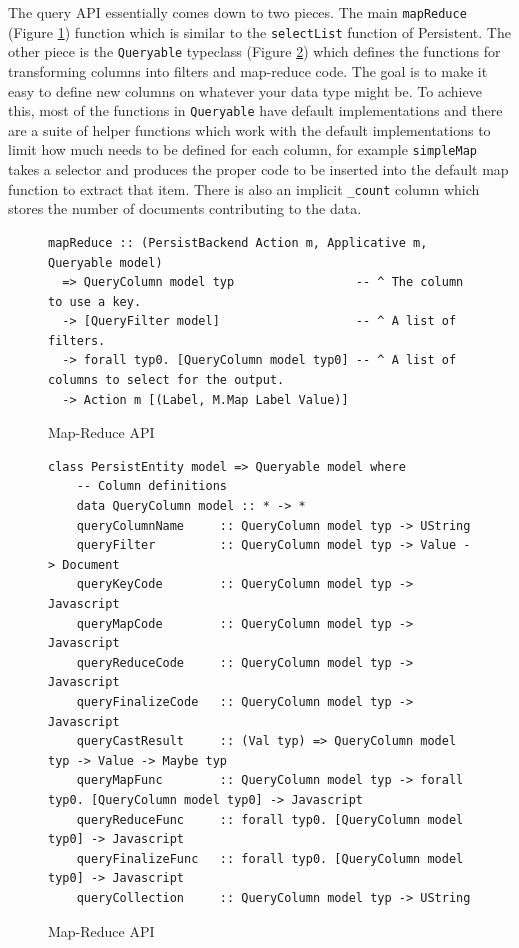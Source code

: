 \documentclass[letterpaper,twocolumn,9pt]{article}
\newcommand{\code}[1]{\texttt{#1}}
\begin{document}
The query API essentially comes down to two pieces.  The main \code{mapReduce} (Figure \ref{mrapi}) function which is similar to the \code{selectList} function of Persistent.  The other piece is the \code{Queryable} typeclass (Figure \ref{queryable}) which defines the functions for transforming columns into filters and map-reduce code.  The goal is to make it easy to define new columns on whatever your data type might be.  To achieve this, most of the functions in \code{Queryable} have default implementations and there are a suite of helper functions which work with the default implementations to limit how much needs to be defined for each column, for example \code{simpleMap} takes a selector and produces the proper code to be inserted into the default map function to extract that item.  There is also an implicit \code{\_count} column which stores the number of documents contributing to the data.

\begin{figure}[t]
\begin{verbatim}
mapReduce :: (PersistBackend Action m, Applicative m, Queryable model)
  => QueryColumn model typ                 -- ^ The column to use a key.
  -> [QueryFilter model]                   -- ^ A list of filters.
  -> forall typ0. [QueryColumn model typ0] -- ^ A list of columns to select for the output.
  -> Action m [(Label, M.Map Label Value)]
\end{verbatim}
    \caption{Map-Reduce API}
    \label{mrapi}
\end{figure}

\begin{figure}[t]
\begin{verbatim}
class PersistEntity model => Queryable model where
    -- Column definitions
    data QueryColumn model :: * -> *
    queryColumnName     :: QueryColumn model typ -> UString
    queryFilter         :: QueryColumn model typ -> Value -> Document
    queryKeyCode        :: QueryColumn model typ -> Javascript
    queryMapCode        :: QueryColumn model typ -> Javascript
    queryReduceCode     :: QueryColumn model typ -> Javascript
    queryFinalizeCode   :: QueryColumn model typ -> Javascript
    queryCastResult     :: (Val typ) => QueryColumn model typ -> Value -> Maybe typ
    queryMapFunc        :: QueryColumn model typ -> forall typ0. [QueryColumn model typ0] -> Javascript
    queryReduceFunc     :: forall typ0. [QueryColumn model typ0] -> Javascript
    queryFinalizeFunc   :: forall typ0. [QueryColumn model typ0] -> Javascript
    queryCollection     :: QueryColumn model typ -> UString
\end{verbatim}
    \caption{Map-Reduce API}
    \label{queryable}
\end{figure}
\end{document}
